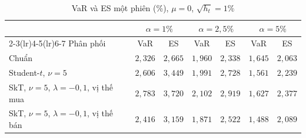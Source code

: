 \documentclass[12pt,a4paper]{article}
\theoremstyle{definition}
\theoremstyle{remark}
\begin{document}
\begin{table}[h]
\centering
\caption{VaR và ES một phiên (\%), $\mu=0$, $\sqrt{h_t}=1\%$}\label{tab:vidu}
\begin{tabular}{@{}lcccccc@{}}
\toprule
 & \multicolumn{2}{c}{$\alpha=1\%$} & \multicolumn{2}{c}{$\alpha=2{,}5\%$} & \multicolumn{2}{c}{$\alpha=5\%$} \\
\cmidrule(lr){2-3}\cmidrule(lr){4-5}\cmidrule(lr){6-7}
Phân phối & VaR & ES & VaR & ES & VaR & ES \\
\midrule
Chuẩn & $2{,}326$ & $2{,}665$ & $1{,}960$ & $2{,}338$ & $1{,}645$ & $2{,}063$ \\
Student-$t$, $\nu=5$ & $2{,}606$ & $3{,}449$ & $1{,}991$ & $2{,}728$ & $1{,}561$ & $2{,}239$ \\
SkT, $\nu=5$, $\lambda=-0{,}1$, vị thế mua & $2{,}783$ & $3{,}720$ & $2{,}102$ & $2{,}919$ & $1{,}627$ & $2{,}377$ \\
SkT, $\nu=5$, $\lambda=-0{,}1$, vị thế bán & $2{,}416$ & $3{,}159$ & $1{,}871$ & $2{,}522$ & $1{,}488$ & $2{,}089$ \\
\bottomrule
\end{tabular}
\end{table}
\end{document}
